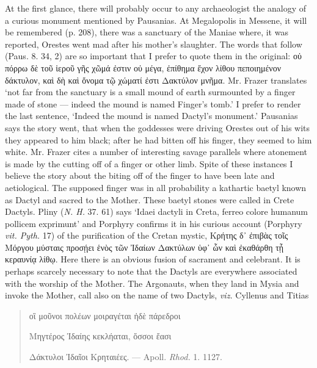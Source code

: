 \documentclass[a4paper, 11pt, oneside, polutonikogreek, english]{article}
\begin{document}
At the first glance, there will probably occur to any archaeologist the analogy of a curious monument mentioned by Pausanias. At Megalopolis in Messene, it will be remembered (p. 208), there was a sanctuary of the Maniae where, it was reported, Orestes went mad after his mother's slaughter. The words that follow (Paus. 8. 34, 2) are so important that I prefer to quote them in the original: οὐ πόρρω δὲ τοῦ ἱεροῦ γῆς χῶμά ἐστιν οὐ μέγα, ἐπίθημα ἔχον λίθου πεποιημένον δάκτυλον, καὶ δὴ καὶ ὄνομα τῷ χώματί ἐστι Δακτύλον μνῆμα. Mr. Frazer translates `not far from the sanctuary is a small mound of earth surmounted by a finger made of stone --- indeed the mound is named Finger's tomb.' I prefer to render the last sentence, `Indeed the mound is named Dactyl's monument.' Pausanias says the story went, that when the goddesses were driving Orestes out of his wits they appeared to him black; after he had bitten off his finger, they seemed to him white. Mr. Frazer cites a number of interesting savage parallels where atonement is made by the cutting off of a finger or other limb. Spite of these instances I believe the story about the biting off of the finger to have been late and aetiological. The supposed finger was in all probability a kathartic baetyl known as Dactyl and sacred to the Mother. These baetyl stones were called in Crete Dactyls. Pliny (\emph{N. H.} 37. 61) says `Idaei dactyli in Creta, ferreo colore humanum pollicem exprimunt' and Porphyry confirms it in his curious account (Porphyry \emph{vit. Pyth.} 17) of the purification of the Cretan mystic, Κρήτης δ᾽ ἐπιβὰς τοῖς Μόργου μύσταις προσῄει ἑνὸς τῶν Ἰδαίων Δακτύλων ὑφ᾽ ὧν καὶ ἐκαθάρθη τᾖ κεραυνίᾳ λίθῳ. Here there is an obvious fusion of sacrament and celebrant. It is perhaps scarcely necessary to note that the Dactyls are everywhere associated with the worship of the Mother. The Argonauts, when they land in Mysia and invoke the Mother, call also on the name of two Dactyls, \emph{viz.} Cyllenus and Titias
\begin{quotation}
οἳ μοῦνοι πολέων μοιραγέται ἠδὲ πάρεδροι

Μηγτέρος Ἰδαίης κεκλήαται, ὅσσοι ἔασι

Δάκτυλοι Ἰδαῖοι Κρηταιέες. --- Apoll. \emph{Rhod.} 1. 1127.
\end{quotation}
\end{document}
